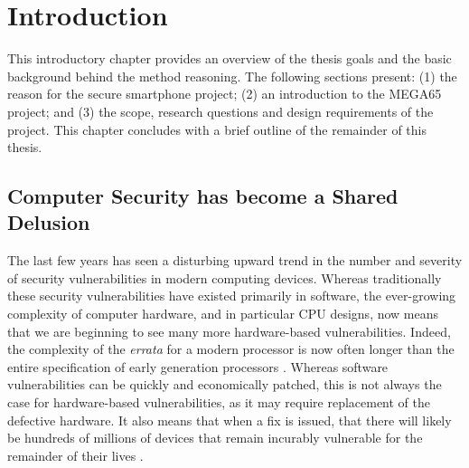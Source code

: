 
\chapter{Introduction} %

\label{Chapter1} %


This introductory chapter provides an overview of the thesis goals and the basic background behind the method reasoning. The following sections present: (1) the reason for the secure smartphone project; (2) an introduction to the MEGA65 project; and (3) the scope, research questions and design requirements of the project. This chapter concludes with a brief outline of the remainder of this thesis.

\section{Computer Security has become a Shared Delusion}

The last few years has seen a disturbing upward trend in the number and severity of security vulnerabilities in modern computing devices.
Whereas traditionally these security vulnerabilities have existed primarily in software, the ever-growing complexity of computer hardware, and in particular CPU designs, now means that we are beginning to see many more hardware-based vulnerabilities.
Indeed, the complexity of the {\em errata} for a modern processor is now often longer than the entire specification of early generation processors .
Whereas software vulnerabilities can be quickly and economically patched, this is not always the case for hardware-based vulnerabilities, as it may require replacement of the defective hardware.  It also means that when a fix is issued, that there will likely be hundreds of millions of devices that remain incurably vulnerable for the remainder of their lives .

